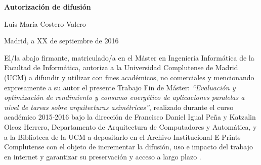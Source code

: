 % 
\newpage

\thispagestyle{empty}

\begin{center}

{\bf \Huge Autorización de difusión}

\vspace{1cm}

% 
   \large Luis María Costero Valero
      
   \vspace{0.5cm}

% 
   Madrid, a XX de septiembre de 2016\\

   \vspace{0.5cm} \end{center}

   El/la abajo firmante, matriculado/a en el Máster en Ingeniería Informática de la 
   Facultad  de  Informática,  autoriza  a  la  Universidad  Complutense  de  Madrid 
   (UCM)   a   difundir   y   utilizar   con   fines   académicos,   no   comerciales   y 
   mencionando  expresamente  a  su  autor  el  presente  Trabajo  Fin  de  Máster: 
   {\em ``Evaluación y optimización de rendimiento y consumo energético de aplicaciones
    paralelas a nivel de tareas sobre arquitecturas asimétricas''},
   realizado durante el curso académico 2015-2016 bajo la dirección 
   de Francisco Daniel Igual Peña y Katzalin Olcoz Herrero, 
   Departamento  de  Arquitectura de Computadores y Automática,  y  a  la  Biblioteca  de  la  UCM  a  depositarlo  en  el 
   Archivo  Institucional  E-Prints  Complutense  con  el  objeto  de  incrementar la difusión,  
   uso  e  impacto  del  trabajo  en  internet  y  garantizar  su  preservación  y acceso a largo plazo
   .


